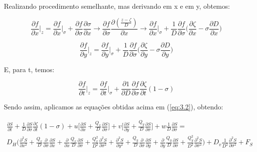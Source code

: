 \documentclass[11pt]{article}
\begin{document}
Realizando procedimento semelhante, mas derivando em x e em y, obtemos:

\begin{equation}
    \frac{\partial{f}}{\partial{x}} \bigg|_z=  \frac{\partial{f}}{\partial{x}} \bigg|_\sigma + \frac{\partial{f}}{\partial{\sigma}}\frac{\partial{\sigma}}{\partial{x}} \rightarrow \frac{\partial{f}}{\partial{\sigma}}\frac{\partial(\frac{z - \zeta}{D})}{\partial{x}} \rightarrow \frac{\partial{f}}{\partial{x}} \bigg|_\sigma +\frac{1}{D}\frac{\partial{f}}{\partial{\sigma}}\bigg( \frac{\partial{\zeta}}{\partial{x}} - \sigma\frac{\partial{D}}{\partial{x}} \bigg)
    \label{eq:3.7}
\end{equation}

\begin{equation}
    \frac{\partial{f}}{\partial{y}}\bigg|_z = \frac{\partial{f}}{\partial{y}}\bigg|_\sigma + \frac{1}{D}\frac{\partial{f}}{\partial{\sigma}}\bigg( \frac{\partial{\zeta}}{\partial{y}} - \sigma\frac{\partial{D}}{\partial{y}} \bigg)
    \label{eq:3.8}
\end{equation}

E, para t, temos:

\begin{equation}
    \frac{\partial{f}}{\partial{t}}\bigg|_z = \frac{\partial{f}}{\partial{t}}\bigg|_\sigma +
    \frac{\partial{1}}{\partial{D}}\frac{\partial{f}}{\partial{\sigma}}\frac{\partial{\zeta}}{\partial{t}}(1 - \sigma)
    \label{eq:3.9}
\end{equation}

Sendo assim, aplicamos as equações obtidas acima em (\ref{eq:3.2}),
obtendo:

\begin{equation}
  \begin{aligned}
  \frac{\partial{S}}{\partial{t}} + \frac{1}{D}\frac{\partial{S}}{\partial{\sigma}}\frac{\partial{\zeta}}{\partial{t}}(1 - \sigma) +
  u\bigg[ \frac{\partial{S}}{\partial{x}} + \frac{Q_x}{D}\frac{\partial{S}}{\partial{\sigma}} \bigg] +
  v\bigg[ \frac{\partial{S}}{\partial{y}} + \frac{Q_y}{D}\frac{\partial{S}}{\partial{\sigma}} \bigg] +
  w\frac{1}{D}\frac{\partial{S}}{\partial{\sigma}} =
  \\
  D_H\bigg( \frac{\partial^2{S}}{\partial{x^2}} + \frac{Q_x}{D}\frac{\partial}{\partial{\sigma}}\frac{\partial{S}}{\partial{x}} +
  \frac{\partial}{\partial{x}}\frac{Q_x}{D}\frac{\partial{S}}{\partial{\sigma}} + \frac{Q^{2}_x}{D^2}\frac{\partial^2{S}}{\partial{\sigma^2}} + \frac{\partial^2{S}}{\partial{y^2}} + \frac{Q_y}{D}\frac{\partial}{\partial{\sigma}}\frac{\partial{S}}{\partial{y}} + \frac{\partial}{\partial{y}}\frac{Q_y}{D}\frac{\partial{S}}{\partial{\sigma}} + \frac{Q^{2}_y}{D^2}\frac{\partial^2{S}}{\partial{\sigma^2}} \bigg) + D_v\frac{1}{D^2}\frac{\partial^2{S}}{\partial{\sigma^2}} + F_S
    \label{eq:3.10}
  \end{aligned}
\end{equation}
\end{document}
